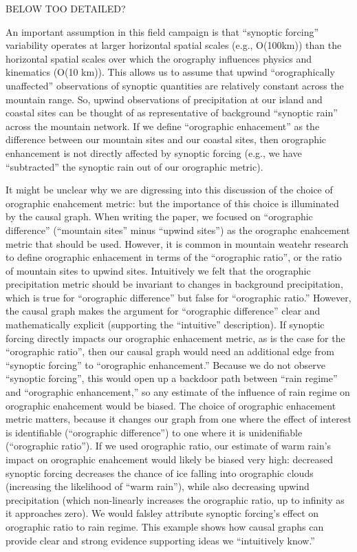 \documentclass[12pt]{article}
\begin{document}
BELOW TOO DETAILED?

An important assumption in this field campaign is that ``synoptic
forcing'' variability operates at larger horizontal spatial scales
(e.g., O(100km)) than the horizontal spatial scales over which the
orography influences physics and kinematics (O(10 km)). This allows us
to assume that upwind ``orographically unaffected'' observations of
synoptic quantities are relatively constant across the mountain
range. So, upwind observations of precipitation at our island and
coastal sites can be thought of as representative of background
``synoptic rain'' across the mountain network. If we define
``orographic enhacement'' as the difference between our mountain sites
and our coastal sites, then orographic enhancement is not directly
affected by synoptic forcing (e.g., we have ``subtracted'' the
synoptic rain out of our orographic metric).

It might be unclear why we are digressing into this discussion of the
choice of orographic enahcement metric: but the importance of this
choice is illuminated by the causal graph. When writing the paper, we
focused on ``orographic difference'' (``mountain sites'' minus
``upwind sites'') as the orographc enahcement metric that should be
used. However, it is common in mountain weatehr research to define
orographic enhacement in terms of the ``orographic ratio'', or the
ratio of mountain sites to upwind sites. Intuitively we felt that the
orographic precipitation metric should be invariant to changes in
background precipitation, which is true for ``orographic difference''
but false for ``orographic ratio.'' However, the causal graph makes
the argument for ``orographic difference'' clear and mathematically
explicit (supporting the ``intuitive'' description). If synoptic
forcing directly impacts our orographic enhacement metric, as is the
case for the ``orographic ratio'', then our causal graph would need an
additional edge from ``synoptic forcing'' to ``orographic
enhancement.'' Because we do not observe ``synoptic forcing'', this
would open up a backdoor path between ``rain regime'' and ``orographic
enhancement,'' so any estimate of the influence of rain regime on
orographic enahcement would be biased. The choice of orographic
enhacement metric matters, because it changes our graph from one where
the effect of interest is identifiable (``orographic difference'') to
one where it is unidenifiable (``orographic ratio''). If we used
orographic ratio, our estimate of warm rain's impact on orographic
enahcement would likely be biased very high: decreased synoptic
forcing decreases the chance of ice falling into orographic clouds
(increasing the likelihood of ``warm rain''), while also decreasing
upwind precipitation (which non-linearly increases the orographic
ratio, up to infinity as it approaches zero). We would falsley
attribute synoptic forcing's effect on orographic ratio to rain
regime. This example shows how causal graphs can provide clear and strong
evidence supporting ideas we ``intuitively know.''
\end{document}
